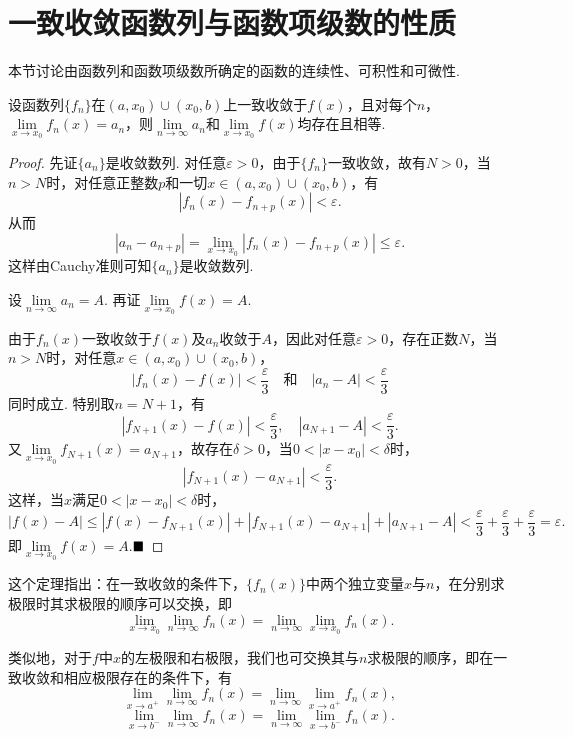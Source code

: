 \section{一致收敛函数列与函数项级数的性质}
本节讨论由函数列和函数项级数所确定的函数的连续性、可积性和可微性.
\begin{theorem}[极限可交换性]\label{limcommutative}
	设函数列$\{f_n\}$在$(a,x_0)\cup(x_0,b)$上一致收敛于$f(x)$，且对每个$n$，$\lim\limits_{x\to x_0}f_n(x)=a_n$，则$\lim\limits_{n\to\infty}a_n$和$\lim\limits_{x\to x_0}f(x)$均存在且相等.
\end{theorem}
\begin{proof}
	先证$\{a_n\}$是收敛数列. 对任意$\varepsilon>0$，由于$\{f_n\}$一致收敛，故有$N>0$，当$n>N$时，对任意正整数$p$和一切$x\in(a,x_0)\cup(x_0,b)$，有
	$$|f_n(x)-f_{n+p}(x)|<\varepsilon.$$
	从而
	$$|a_n-a_{n+p}|=\lim\limits_{x\to x_0}|f_n(x)-f_{n+p}(x)|\leqslant\varepsilon.$$
	这样由Cauchy准则可知$\{a_n\}$是收敛数列.
	
	\hspace*{\fill}
	
	设$\lim\limits_{n\to\infty}a_n=A$. 再证$\lim\limits_{x\to x_0}f(x)=A$.
	
	\hspace*{\fill}
	
	由于$f_n(x)$一致收敛于$f(x)$及$a_n$收敛于$A$，因此对任意$\varepsilon>0$，存在正数$N$，当$n>N$时，对任意$x\in (a,x_0)\cup(x_0,b)$，
	$$|f_n(x)-f(x)|<\frac{\varepsilon}{3}\quad\text{和}\quad |a_n-A|<\frac{\varepsilon}{3}$$
	同时成立. 特别取$n=N+1$，有
	$$|f_{N+1}(x)-f(x)|<\frac{\varepsilon}{3},\quad |a_{N+1}-A|<\frac{\varepsilon}{3}.$$
	又$\lim\limits_{x\to x_0}f_{N+1}(x)=a_{N+1}$，故存在$\delta>0$，当$0<|x-x_0|<\delta$时，
	$$|f_{N+1}(x)-a_{N+1}|<\frac{\varepsilon}{3}.$$
	这样，当$x$满足$0<|x-x_0|<\delta$时，
	$$|f(x)-A|\leqslant |f(x)-f_{N+1}(x)|+|f_{N+1}(x)-a_{N+1}|+|a_{N+1}-A|<\frac{\varepsilon}{3}+\frac{\varepsilon}{3}+\frac{\varepsilon}{3}=\varepsilon.$$
	即$\lim\limits_{x\to x_0}f(x)=A$.$\hfill\blacksquare$
\end{proof}
\begin{remark}
	这个定理指出：在一致收敛的条件下，$\{f_n(x)\}$中两个独立变量$x$与$n$，在分别求极限时其求极限的顺序可以交换，即
	$$\lim\limits_{x\to x_0}\lim\limits_{n\to\infty}f_n(x)=\lim\limits_{n\to\infty}\lim\limits_{x\to x_0}f_n(x).$$
\end{remark}
\begin{remark}
	类似地，对于$f$中$x$的左极限和右极限，我们也可交换其与$n$求极限的顺序，即在一致收敛和相应极限存在的条件下，有
	$$\lim\limits_{x\to a^+}\lim\limits_{n\to\infty}f_n(x)=\lim\limits_{n\to\infty}\lim\limits_{x\to a^+}f_n(x),$$
	$$\lim\limits_{x\to b^-}\lim\limits_{n\to\infty}f_n(x)=\lim\limits_{n\to\infty}\lim\limits_{x\to b^-}f_n(x).$$
\end{remark}
